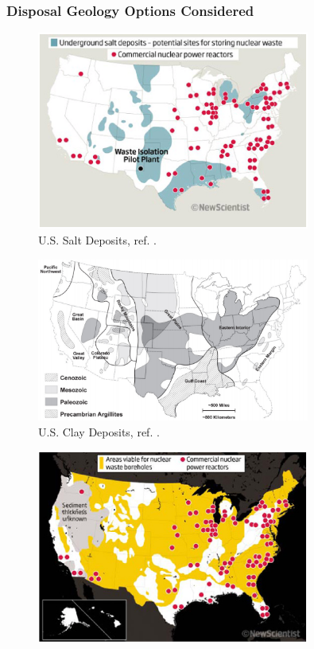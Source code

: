 

\begin{frame}[ctb!]
  \frametitle{Disposal Geology Options Considered}
   \begin{minipage}{0.44\textwidth}
     \begin{figure}[h!]
         \includegraphics[width=0.8\textwidth]{./images/saltNewScientist.eps}
         \caption{U.S. Salt Deposits, ref. \cite{newscientist_where_2011}.}
     \end{figure}
     \begin{figure}[h!]
         \includegraphics[width=0.8\textwidth]{./images/clayGonzales.eps}
         \caption{U.S. Clay Deposits, ref. \cite{gonzales_shales_1985}.}
     \end{figure}
   \end{minipage}
   \begin{minipage}{0.44\textwidth}
     \begin{figure}[h!]
         \includegraphics[width=0.8\textwidth]{./images/boreholeNewScientist.eps}

\end{figure}
\end{minipage}
\end{frame}
